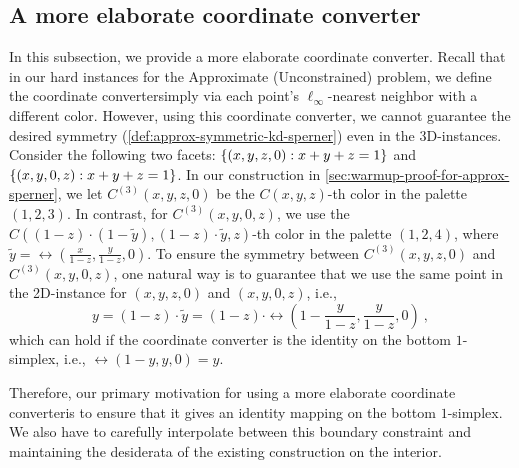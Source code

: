 \subsection{A more elaborate coordinate converter}
\label{subsec:more-elaborate-coordinate-converter}
In this subsection, we provide a more elaborate coordinate converter.  
Recall that in our hard instances for the \outofk Approximate (Unconstrained) \Sperner problem, 
we define the coordinate convertersimply via each point's $\ell_{\infty}$-nearest neighbor with a different color. 
However, using this coordinate converter, we cannot guarantee the desired symmetry (\cref{def:approx-symmetric-kd-sperner}) even in the $3${\rm D}-instances.
Consider the following two facets: $\{{(x,y,z,0):x+y+z=1} \}$ and $\{{(x,y,0,z):x+y+z=1} \}$. 
In our construction in \cref{sec:warmup-proof-for-approx-sperner}, we let $C^{(3)}(x,y,z,0)$ be  the $C(x,y,z)$-th color in the palette $(1,2,3)$. 
In contrast, for $C^{(3)}(x,y,0,z)$, we use the $C((1-z)\cdot (1-\tilde{y}),(1-z)\cdot \tilde{y},z)$-th color in the palette $(1,2,4)$, where $\tilde{y}=\rel(\frac{x}{1-z},\frac{y}{1-z},0)$. 
To ensure the symmetry between $C^{(3)}(x,y,z,0)$ and $C^{(3)}(x,y,0,z)$, 
one natural way is to guarantee that we use the same point in the 2{\rm D}-\Sperner instance for $(x,y,z,0)$ and $(x,y,0,z)$, i.e., 
\[y=(1-z)\cdot \tilde{y}=(1-z)\cdot \rel\left(1-\frac{y}{1-z},\frac{y}{1-z},0\right)~,\]
which can hold if the coordinate converter is the identity on the bottom $1$-simplex, i.e., $\rel(1-y,y,0)=y$. 

Therefore, our primary motivation for using a more elaborate coordinate converteris to ensure that it gives an identity mapping on the bottom $1$-simplex. We also have to carefully interpolate between this boundary constraint and maintaining the desiderata of the existing construction on the interior. 

